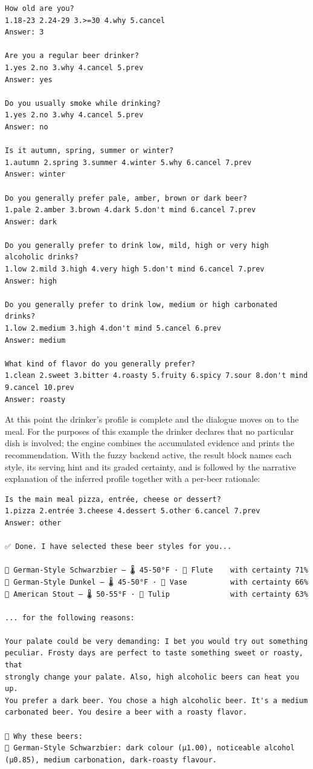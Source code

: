 \begin{lstlisting}[numbers=none]
How old are you?
1.18-23 2.24-29 3.>=30 4.why 5.cancel
Answer: 3

Are you a regular beer drinker?
1.yes 2.no 3.why 4.cancel 5.prev
Answer: yes

Do you usually smoke while drinking?
1.yes 2.no 3.why 4.cancel 5.prev
Answer: no

Is it autumn, spring, summer or winter?
1.autumn 2.spring 3.summer 4.winter 5.why 6.cancel 7.prev
Answer: winter

Do you generally prefer pale, amber, brown or dark beer?
1.pale 2.amber 3.brown 4.dark 5.don't mind 6.cancel 7.prev
Answer: dark

Do you generally prefer to drink low, mild, high or very high alcoholic drinks?
1.low 2.mild 3.high 4.very high 5.don't mind 6.cancel 7.prev
Answer: high

Do you generally prefer to drink low, medium or high carbonated drinks?
1.low 2.medium 3.high 4.don't mind 5.cancel 6.prev
Answer: medium

What kind of flavor do you generally prefer?
1.clean 2.sweet 3.bitter 4.roasty 5.fruity 6.spicy 7.sour 8.don't mind 9.cancel 10.prev
Answer: roasty
\end{lstlisting}

At this point the drinker's profile is complete and the dialogue moves on to the
meal. For the purposes of this example the drinker declares that no particular
dish is involved; the engine combines the accumulated evidence and prints the
recommendation. With the fuzzy backend active, the result block names each style,
its serving hint and its graded certainty, and is followed by the narrative
explanation of the inferred profile together with a per-beer rationale:

\begin{lstlisting}[numbers=none]
Is the main meal pizza, entrée, cheese or dessert?
1.pizza 2.entrée 3.cheese 4.dessert 5.other 6.cancel 7.prev
Answer: other

✅ Done. I have selected these beer styles for you...

🍺 German-Style Schwarzbier — 🌡 45-50°F · 🥃 Flute    with certainty 71%
🍺 German-Style Dunkel — 🌡 45-50°F · 🥃 Vase          with certainty 66%
🍺 American Stout — 🌡 50-55°F · 🥃 Tulip              with certainty 63%

... for the following reasons:

Your palate could be very demanding: I bet you would try out something
peculiar. Frosty days are perfect to taste something sweet or roasty, that
strongly change your palate. Also, high alcoholic beers can heat you up.
You prefer a dark beer. You chose a high alcoholic beer. It's a medium
carbonated beer. You desire a beer with a roasty flavor.

🔎 Why these beers:
🍺 German-Style Schwarzbier: dark colour (μ1.00), noticeable alcohol
(μ0.85), medium carbonation, dark-roasty flavour.
\end{lstlisting}

